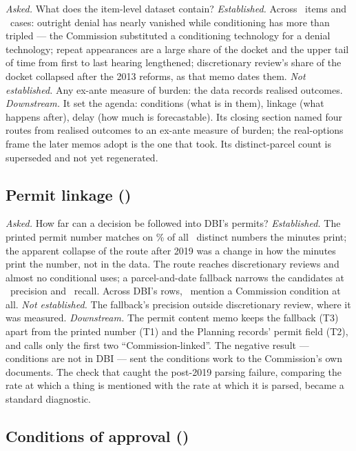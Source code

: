 \documentclass[11pt]{article}
\begin{document}
\textit{Asked.} What does the item-level dataset contain? \textit{Established.} Across
\chItems\ items and \corpusUniverse\ cases: outright denial has nearly vanished while conditioning
has more than tripled --- the Commission substituted a conditioning technology for a denial
technology; repeat appearances are a large share of the docket and the upper tail of time from
first to last hearing lengthened; discretionary review's share of the docket collapsed after the
2013 reforms, as that memo dates them. \textit{Not established.} Any ex-ante measure of burden: the data records realised
outcomes. \textit{Downstream.} It set the agenda: conditions (what is in them), linkage (what
happens after), delay (how much is forecastable). Its closing section named four routes from
realised outcomes to an ex-ante measure of burden; the real-options frame the later memos adopt
is the one that took. Its distinct-parcel count is superseded and not yet regenerated.

\subsection{Permit linkage (\chDatePermitLinkage)}\label{sec:chpermitlinkage}

\textit{Asked.} How far can a decision be followed into DBI's permits? \textit{Established.} The
printed permit number matches on \chPermitMatch\% of all \chPermitsDistinct\ distinct numbers the
minutes print; the apparent collapse of the route after 2019 was a change in how the minutes
print the number, not in the data. The route reaches discretionary reviews and almost no
conditional uses; a parcel-and-date fallback narrows the candidates at \chParcelPrecision\
precision and \chParcelRecall\ recall. Across DBI's rows, \chDbiCondTalk\ mention a Commission
condition at all. \textit{Not established.} The fallback's precision outside discretionary review,
where it was measured. \textit{Downstream.} The permit content memo keeps the fallback (T3) apart
from the printed number (T1) and the Planning records' permit field (T2), and calls only the first
two ``Commission-linked''. The negative result --- conditions are not in DBI --- sent the
conditions work to the Commission's own documents. The check that caught the post-2019
parsing failure, comparing the rate at which a thing is mentioned with the rate at which it is
parsed, became a standard diagnostic.

\subsection{Conditions of approval (\chDateConditionsOfApproval)}\label{sec:chconditionsofapproval}
\end{document}
